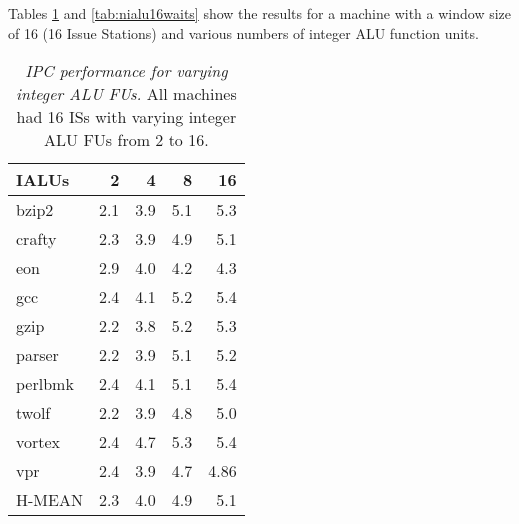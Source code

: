 \documentclass[10pt,dvips]{article}
\begin{document}
Tables \ref{tab:nialu16ipc} 
and \ref{tab:nialu16waits} 
show the results
for a machine with a window size of 16 (16 Issue Stations) and various
numbers of integer ALU function units.  
%
\begin{table}[p]
\begin{center}
\caption{{\em IPC performance for varying integer ALU FUs.}
All machines had 16 ISs with varying integer ALU FUs from 2 to 16.}
\label{tab:nialu16ipc}
\vspace{+0.1in}
\begin{tabular}{|l||r|r|r|r|}
\hline 
{IALUs}& 2 & 4 & 8 & 16 \\
\hline

\hline
bzip2&
2.1 & 3.9 & 5.1 & 5.3 \\

\hline
crafty&
2.3 & 3.9 & 4.9 & 5.1 \\

\hline
eon&
2.9 & 4.0 & 4.2 &  4.3 \\

\hline
gcc&
2.4 & 4.1 & 5.2 & 5.4 \\

\hline
gzip&
2.2 & 3.8 & 5.2 & 5.3 \\

\hline
parser&
2.2 & 3.9 & 5.1 & 5.2 \\

\hline
perlbmk&
2.4 & 4.1 & 5.1 & 5.4 \\

\hline
twolf&
2.2 & 3.9 & 4.8 & 5.0 \\

\hline
vortex&
2.4 & 4.7 & 5.3 & 5.4 \\

\hline
vpr&
2.4 & 3.9 & 4.7 & 4.86 \\

\hline
H-MEAN&
2.3 & 4.0 & 4.9 & 5.1 \\

\hline
\end{tabular}
\end{center}
\end{table}
%
%
\end{document}
